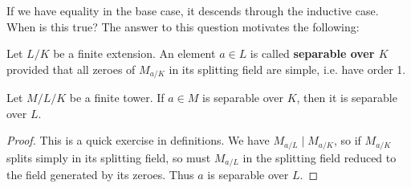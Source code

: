 \begin{rmk}
	If we have equality in the base case, it descends through the inductive case. When is this true? The answer to this question motivates the following:
\end{rmk}

\begin{defn}
	Let $L/K$ be a finite extension. An element $a \in L$ is called \textbf{separable over $K$} provided that all zeroes of $M_{a/K}$ in its splitting field are simple, i.e. have order 1.
\end{defn}

\begin{fact}
	Let $M/L/K$ be a finite tower. If $a \in M$ is separable over $K$, then it is separable over $L$.
\end{fact}

\begin{proof}
	This is a quick exercise in definitions. We have $M_{a/L} \mid M_{a/K}$, so if $M_{a/K}$ splits simply in its splitting field, so must $M_{a/L}$ in the splitting field reduced to the field generated by its zeroes. Thus $a$ is separable over $L$.
\end{proof}
